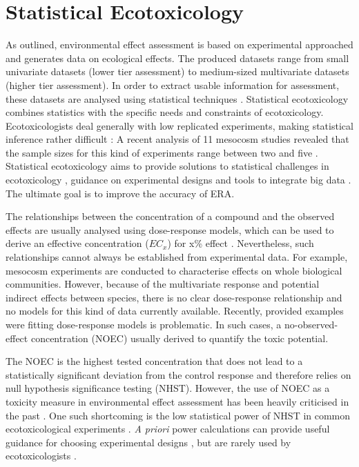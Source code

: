 \section{Statistical Ecotoxicology}

As outlined, environmental effect assessment is based on experimental approached and generates data on ecological effects.
The produced datasets range from small univariate datasets (lower tier assessment) to medium-sized multivariate datasets (higher tier assessment).
In order to extract usable information for assessment, these datasets are analysed using statistical techniques \citep{newman_quantitative_2012}. 
Statistical ecotoxicology combines statistics with the specific needs and constraints of ecotoxicology. 
Ecotoxicologists deal generally with low replicated experiments, making statistical inference rather difficult \citep{van_der_hoeven_power_1998}:
A recent analysis of 11 mesocosm studies revealed that the sample sizes for this kind of experiments range between two and five \citep{szocs_analysing_2015}.
Statistical ecotoxicology aims to provide solutions to statistical challenges in ecotoxicology \citep{fox_comment_2016}, guidance on experimental designs \citep{johnson_power_2015} and tools to integrate big data \citep {van_den_brink_new_2016}.
The ultimate goal is to improve the accuracy of ERA. 

The relationships between the concentration of a compound and the observed effects are usually analysed using dose-response models, which can be used to derive an effective concentration ($EC_{x}$) for x\% effect  \citep{ritz_toward_2010}. 
Nevertheless, such relationships cannot always be established from experimental data.
For example, mesocosm experiments are conducted to characterise effects on whole biological communities.
However, because of the multivariate response and potential indirect effects between species, there is no clear dose-response relationship and no models for this kind of data currently available. 
Recently, \citet{green_issues_2016} provided examples were fitting dose-response models is problematic. 
In such cases, a no-observed-effect concentration (NOEC) usually derived to quantify the toxic potential.

The NOEC is the highest tested concentration that does not lead to a statistically significant deviation from the control response and therefore relies on null hypothesis significance testing (NHST). 
However, the use of NOEC as a toxicity measure in environmental effect assessment has been heavily criticised in the past \citep{laskowski_good_1995, chapman_warning:_1996, warne_noec_2008, fox_what_2012, jager_bad_2012, fox_dont_2016}. 
One such shortcoming is the low statistical power of NHST in common ecotoxicological experiments \citep{van_der_hoeven_power_1998}.
\emph{A priori} power calculations can provide useful guidance for choosing experimental designs \citep{johnson_power_2015}, but are rarely used by ecotoxicologists \citep{newman_what_2008}. 

